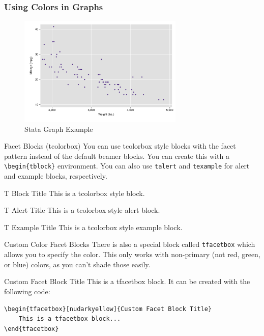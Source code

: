 \documentclass[aspectratio=1610]{beamer}
\begin{document}
\begin{frame}[fragile]
    \frametitle{Using Colors in Graphs}
    \begin{figure}
        \centering
        \includegraphics[width=0.7\textwidth]{graphs/plot-stata.pdf}
        \caption{Stata Graph Example}
        \label{fig:graph-stata}
    \end{figure}
\end{frame}


\begin{frame}{Facet Blocks (tcolorbox)}
    You can use tcolorbox style blocks with the facet pattern instead of the default beamer blocks. You can create this with a \texttt{\textbackslash begin\{tblock\}} environment. You can also use \texttt{talert} and \texttt{texample} for alert and example blocks, respectively.
    \begin{tblock}{T Block Title}
        This is a tcolorbox style block.
    \end{tblock}
    \begin{talert}{T Alert Title}
        This is a tcolorbox style alert block.
    \end{talert}
    \begin{texample}{T Example Title}
        This is a tcolorbox style example block.
    \end{texample}
\end{frame}

\begin{frame}[fragile]{Custom Color Facet Blocks}
    There is also a special block called \texttt{tfacetbox} which allows you to specify the color. This only works with non-primary (not red, green, or blue) colors, as you can't shade those easily.
    \begin{tfacetbox}[nudarkyellow]{Custom Facet Block Title}
        This is a tfacetbox block. It can be created with the following code:
        \begin{verbatim}
\begin{tfacetbox}[nudarkyellow]{Custom Facet Block Title}
    This is a tfacetbox block...
\end{tfacetbox}
        \end{verbatim}
    \end{tfacetbox}
\end{frame}
\end{document}
